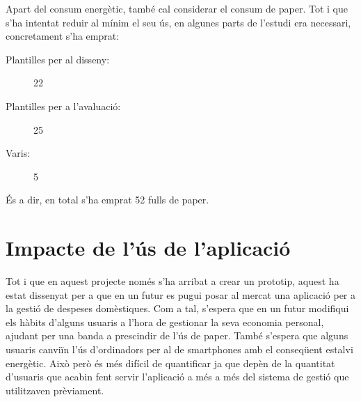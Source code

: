 Apart del consum energètic, també cal considerar el consum de paper. Tot i que s'ha intentat reduir al mínim el seu ús, en algunes parts de l'estudi era necessari, concretament s'ha emprat:

\begin{description}
\item[Plantilles per al disseny:] 22 
\item[Plantilles per a l'avaluació:] 25
\item[Varis:] 5
\end{description}

És a dir, en total s'ha emprat 52 fulls de paper.

\section{Impacte de l'ús de l'aplicació}
Tot i que en aquest projecte només s'ha arribat a crear un prototip, aquest ha estat dissenyat per a que en un futur es pugui posar al mercat una aplicació per a la gestió de despeses domèstiques. Com a tal, s'espera que en un futur modifiqui els hàbits d'alguns usuaris a l'hora de gestionar la seva economia personal, ajudant per una banda a prescindir de l'ús de paper. També s'espera que alguns usuaris canviïn l'ús d'ordinadors per al de \glspl{smartphone} amb el conseqüent estalvi energètic. Això però és més difícil de quantificar ja que depèn de la quantitat d'usuaris que acabin fent servir l'aplicació a més a més del sistema de gestió que utilitzaven prèviament. 
